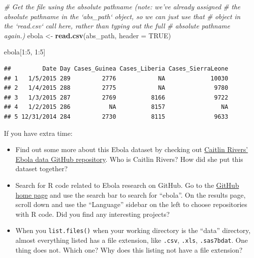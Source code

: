 \documentclass[]{book}
\makeatletter
\newenvironment{Shaded}{\begin{snugshade}}{\end{snugshade}}
\newcommand{\KeywordTok}[1]{\textcolor[rgb]{0.13,0.29,0.53}{\textbf{{#1}}}}
\newcommand{\DataTypeTok}[1]{\textcolor[rgb]{0.13,0.29,0.53}{{#1}}}
\newcommand{\DecValTok}[1]{\textcolor[rgb]{0.00,0.00,0.81}{{#1}}}
\newcommand{\StringTok}[1]{\textcolor[rgb]{0.31,0.60,0.02}{{#1}}}
\newcommand{\CommentTok}[1]{\textcolor[rgb]{0.56,0.35,0.01}{\textit{{#1}}}}
\newcommand{\OtherTok}[1]{\textcolor[rgb]{0.56,0.35,0.01}{{#1}}}
\newcommand{\NormalTok}[1]{{#1}}
\providecommand{\tightlist}{%
  \setlength{\itemsep}{0pt}\setlength{\parskip}{0pt}}
\newenvironment{kframe}{%
\medskip{}
\setlength{\fboxsep}{.8em}
 \def\at@end@of@kframe{}%
 \ifinner\ifhmode%
  \def\at@end@of@kframe{\end{minipage}}%
  \begin{minipage}{\columnwidth}%
 \fi\fi%
 \def\FrameCommand##1{\hskip\@totalleftmargin \hskip-\fboxsep
 \colorbox{shadecolor}{##1}\hskip-\fboxsep
     \hskip-\linewidth \hskip-\@totalleftmargin \hskip\columnwidth}%
 \MakeFramed {\advance\hsize-\width
   \@totalleftmargin\z@ \linewidth\hsize
   \@setminipage}}%
 {\par\unskip\endMakeFramed%
 \at@end@of@kframe}
\renewenvironment{Shaded}{\begin{kframe}}{\end{kframe}}
\makeatother
\begin{document}
\begin{Shaded}
\begin{Highlighting}[]
\CommentTok{# Get the file using the absolute pathname (note: we've already assigned}
\CommentTok{# the absolute pathname in the `abs_path` object, so we can just use that }
\CommentTok{# object in the `read.csv` call here, rather than typing out the full }
\CommentTok{# absolute pathname again.)}
\NormalTok{ebola <-}\StringTok{ }\KeywordTok{read.csv}\NormalTok{(abs_path, }\DataTypeTok{header =} \OtherTok{TRUE}\NormalTok{) }
\end{Highlighting}
\end{Shaded}

\begin{Shaded}
\begin{Highlighting}[]
\NormalTok{ebola[}\DecValTok{1}\NormalTok{:}\DecValTok{5}\NormalTok{, }\DecValTok{1}\NormalTok{:}\DecValTok{5}\NormalTok{]}
\end{Highlighting}
\end{Shaded}

\begin{verbatim}
##         Date Day Cases_Guinea Cases_Liberia Cases_SierraLeone
## 1   1/5/2015 289         2776            NA             10030
## 2   1/4/2015 288         2775            NA              9780
## 3   1/3/2015 287         2769          8166              9722
## 4   1/2/2015 286           NA          8157                NA
## 5 12/31/2014 284         2730          8115              9633
\end{verbatim}

If you have extra time:

\begin{itemize}
\tightlist
\item
  Find out some more about this Ebola dataset by checking out
  \href{https://github.com/cmrivers/ebola}{Caitlin Rivers' Ebola data
  GitHub repository}. Who is Caitlin Rivers? How did she put this
  dataset together?
\item
  Search for R code related to Ebola research on GitHub. Go to the
  \href{https://github.com}{GitHub home page} and use the search bar to
  search for ``ebola''. On the results page, scroll down and use the
  ``Language'' sidebar on the left to choose repositories with R code.
  Did you find any interesting projects?
\item
  When you \texttt{list.files()} when your working directory is the
  ``data'' directory, almost everything listed has a file extension,
  like \texttt{.csv}, \texttt{.xls}, \texttt{.sas7bdat}. One thing does
  not. Which one? Why does this listing not have a file extension?
\end{itemize}
\end{document}
